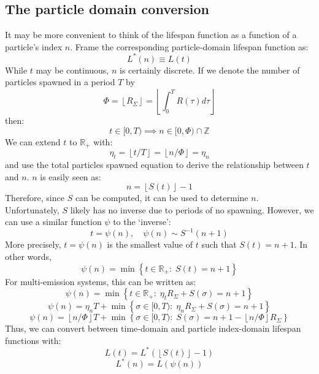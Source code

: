 \documentclass[10pt]{report}
\newcommand{\floor}[1]{\left\lfloor #1 \right\rfloor}
\begin{document}
\subsection{The particle domain conversion}
It may be more convenient to think of the lifespan function as a function of a particle's index $n$. Frame the corresponding particle-domain lifespan function as:
\begin{equation}L^*(n)\equiv L(t)\end{equation}
While $t$ may be continuous, $n$ is certainly discrete. If we denote the number of particles spawned in a period $T$ by
\begin{equation}\Phi=\floor{R_\Sigma}=\floor{\int_0^TR(\tau)d\tau}\end{equation}
then:
\begin{equation}t\in[0,T)\implies n\in[0,\Phi)\cap\mathbb{Z}\end{equation}
We can extend $t$ to $\mathbb{R}_+$ with:
\begin{equation}\eta_t=\floor{t/T}=\floor{n/\Phi}=\eta_n\end{equation}
and use the total particles spawned equation to derive the relationship between $t$ and $n$.  $n$ is easily seen as:
\begin{equation}n=\floor{S(t)}-1\end{equation}
Therefore, since $S$ can be computed, it can be used to determine $n$. Unfortunately, $S$ likely has no inverse due to periods of no spawning. However, we can use a similar function $\psi$ to the `inverse':
\begin{equation}t=\psi(n),\quad \psi(n)\sim S^{-1}(n+1)\end{equation}
More precisely, $t=\psi(n)$ is the smallest value of $t$ such that $S(t)=n+1$. In other words,
\begin{equation}\psi(n)=\min\left\{t\in\mathbb{R}_+:\;S(t)=n+1\right\}\end{equation}
For multi-emission systems, this can be written as:
\begin{equation}\psi(n)=\min\left\{t\in\mathbb{R}_+:\;\eta_t R_\Sigma+S(\sigma)=n+1\right\}\end{equation}
\begin{equation}\psi(n)=\eta_n T+\min\left\{\sigma\in[0,T):\;\eta_n R_\Sigma+S(\sigma)=n+1\right\}\end{equation}
\begin{equation}\psi(n)=\floor{n/\Phi}T+\min\left\{\sigma\in[0,T):\;S(\sigma)=n+1-\floor{n/\Phi}R_\Sigma\right\}\end{equation}
Thus, we can convert between time-domain and particle index-domain lifespan functions with:
\begin{equation}L(t)=L^*(\floor{S(t)}-1)\end{equation}
\begin{equation}L^*(n)=L(\psi(n))\end{equation}
\end{document}
